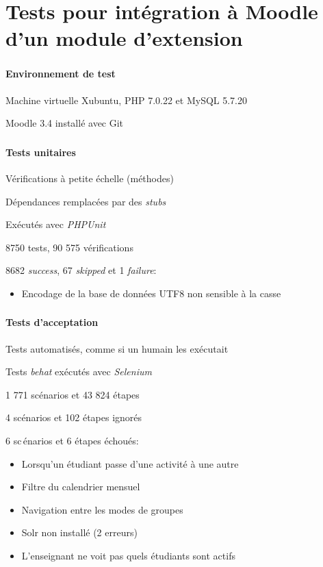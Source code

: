 \documentclass{beamer}
\begin{document}
  \section[Tests]{Tests pour int\'egration \`a Moodle d'un module d'extension}
  \begin{frame}
  \frametitle{\insertsection}
  \framesubtitle{Environnement de test}
  Machine virtuelle Xubuntu, PHP 7.0.22 et MySQL 5.7.20
  
  Moodle 3.4 install\'e avec Git
  \end{frame}
  
  \begin{frame}
  \frametitle{\insertsection}
  \framesubtitle{Tests unitaires}
  V\'erifications \`a petite \'echelle (m\'ethodes)
  
  D\'ependances remplac\'ees par des \textit{stubs}
  
  Ex\'ecut\'es avec \textit{PHPUnit}
  
  \bigskip
  
  8750 tests, 90 575 v\'erifications
  
  8682 \textit{success}, 67 \textit{skipped} et 1 \textit{failure}:
  \begin{itemize}
    \item Encodage de la base de donn\'ees UTF8 non sensible \`a la casse
  \end{itemize}
  \end{frame}
  
  \begin{frame}
  \frametitle{\insertsection}
  \framesubtitle{Tests d'acceptation}
  Tests automatis\'es, comme si un humain les ex\'ecutait
  
  Tests \textit{behat} ex\'ecut\'es avec \textit{Selenium}
  
  \bigskip
  
  1 771 sc\'enarios et 43 824 \'etapes
  
  4 sc\'enarios et 102 \'etapes ignor\'es
  
  6 sc\,énarios et 6 \'etapes \'echou\'es:
  \begin{itemize}
    \item Lorsqu'un \'etudiant passe d'une activit\'e \`a une autre
    \item Filtre du calendrier mensuel
    \item Navigation entre les modes de groupes
    \item Solr non install\'e (2 erreurs)
    \item L'enseignant ne voit pas quels \'etudiants sont actifs
  \end{itemize}
  \end{frame}
  
\end{document}
